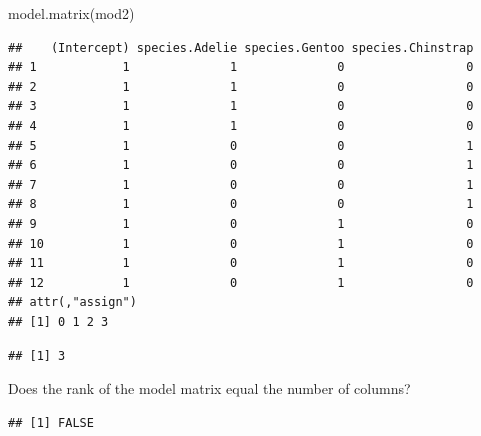 \documentclass[
  openany]{book}
\newenvironment{Shaded}{\begin{snugshade}}{\end{snugshade}}
\newcommand{\FunctionTok}[1]{\textcolor[rgb]{0.00,0.00,0.00}{#1}}
\newcommand{\NormalTok}[1]{#1}
\newcommand{\SpecialCharTok}[1]{\textcolor[rgb]{0.00,0.00,0.00}{#1}}
\begin{document}
\begin{Shaded}
\begin{Highlighting}[]
\FunctionTok{model.matrix}\NormalTok{(mod2)}
\end{Highlighting}
\end{Shaded}

\begin{verbatim}
##    (Intercept) species.Adelie species.Gentoo species.Chinstrap
## 1            1              1              0                 0
## 2            1              1              0                 0
## 3            1              1              0                 0
## 4            1              1              0                 0
## 5            1              0              0                 1
## 6            1              0              0                 1
## 7            1              0              0                 1
## 8            1              0              0                 1
## 9            1              0              1                 0
## 10           1              0              1                 0
## 11           1              0              1                 0
## 12           1              0              1                 0
## attr(,"assign")
## [1] 0 1 2 3
\end{verbatim}

\begin{Shaded}
\end{Shaded}

\begin{verbatim}
## [1] 3
\end{verbatim}

Does the rank of the model matrix equal the number of columns?

\begin{Shaded}
\end{Shaded}

\begin{verbatim}
## [1] FALSE
\end{verbatim}
\end{document}
